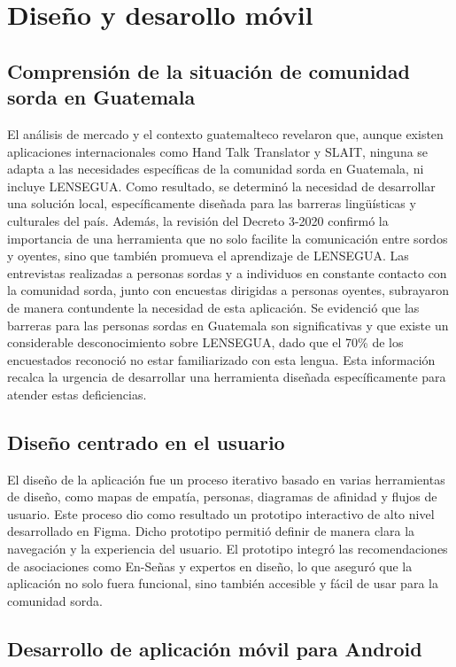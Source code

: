 \section{Diseño y desarollo móvil}
\subsection{Comprensión de la situación de comunidad sorda en Guatemala}

El análisis de mercado y el contexto guatemalteco revelaron que, aunque existen aplicaciones internacionales como Hand Talk Translator y SLAIT, ninguna se adapta a las necesidades específicas de la comunidad sorda en Guatemala, ni incluye LENSEGUA. Como resultado, se determinó la necesidad de desarrollar una solución local, específicamente diseñada para las barreras lingüísticas y culturales del país. Además, la revisión del Decreto 3-2020 confirmó la importancia de una herramienta que no solo facilite la comunicación entre sordos y oyentes, sino que también promueva el aprendizaje de LENSEGUA. Las entrevistas realizadas a personas sordas y a individuos en constante contacto con la comunidad sorda, junto con encuestas dirigidas a personas oyentes, subrayaron de manera contundente la necesidad de esta aplicación. Se evidenció que las barreras para las personas sordas en Guatemala son significativas y que existe un considerable desconocimiento sobre LENSEGUA, dado que el 70\% de los encuestados reconoció no estar familiarizado con esta lengua. Esta información recalca la urgencia de desarrollar una herramienta diseñada específicamente para atender estas deficiencias.

\subsection{Diseño centrado en el usuario}

El diseño de la aplicación fue un proceso iterativo basado en varias herramientas de diseño, como mapas de empatía, personas, diagramas de afinidad y flujos de usuario. Este proceso dio como resultado un prototipo interactivo de alto nivel desarrollado en Figma. Dicho prototipo permitió definir de manera clara la navegación y la experiencia del usuario. El prototipo integró las recomendaciones de asociaciones como En-Señas y expertos en diseño, lo que aseguró que la aplicación no solo fuera funcional, sino también accesible y fácil de usar para la comunidad sorda. 


\subsection{Desarrollo de aplicación móvil para Android}

